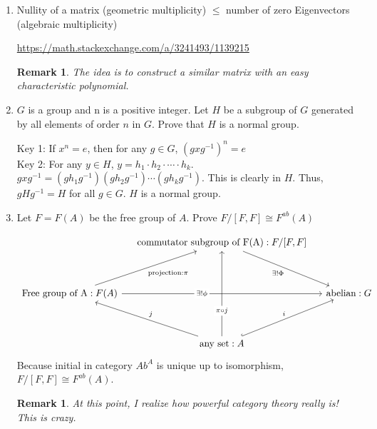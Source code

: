 \documentclass{article}
\newenvironment{solution}{
  \begin{tcolorbox}[mysolutionbox]
}{
  \end{tcolorbox}
}
\newtheorem{remark}[theorem]{Remark}
\begin{document}
\begin{enumerate}
    \item Nullity of a matrix (geometric multiplicity)  $\leq$ number of zero Eigenvectors (algebraic multiplicity)
    \begin{solution}
    \href{https://math.stackexchange.com/a/3241493/1139215}{https://math.stackexchange.com/a/3241493/1139215}
    \end{solution}
    \begin{remark}
        The idea is to construct a similar matrix with an easy characteristic  polynomial.
    \end{remark}
    \item $G$ is a group and n is a positive integer. Let $H$ be a subgroup of $G$ generated by all elements of order $n$ in $G$. Prove that $H$ is a normal group. 
    \begin{solution}
    Key 1: If $x^n=e$, then for any $g \in G$, $(gxg^{-1})^n=e$
    \\
    Key 2: For any $y \in H$, $y=h_1 \cdot h_2 \cdot \cdots \cdot h_k$. $gxg^{-1}=(gh_1g^{-1})(gh_2g^{-1}) \cdots (gh_kg^{-1})$. This is clearly in $H$. Thus, $gHg^{-1}=H$ for all $g \in G$. $H$ is a normal group. 
    \end{solution}
    \item Let $F=F(A)$ be the free group of $A$. Prove $F/[F,F]\cong F^{ab}(A)$
    \begin{solution}
        \[\begin{tikzcd}[column sep=tiny]
	&& {\text{commutator subgroup of F(A)}:F/[F,F]} \\
	\\
	{\text{Free group of A}: F(A)} &&&& \text{abelian}: G \\
	\\
	&& \text{any set}: A
	\arrow["{\exists! \Phi}"', from=1-3, to=3-5]
	\arrow["{\text{projection}:\pi}"', from=3-1, to=1-3]
	\arrow["{\exists !\phi}"{description, pos=0.4}, from=3-1, to=3-5]
	\arrow["{\pi \circ j}"{description, pos=0.3}, from=5-3, to=1-3]
	\arrow["j"', from=5-3, to=3-1]
	\arrow["i", hook, from=5-3, to=3-5]
\end{tikzcd}\]
    Because initial in category $Ab^{A}$ is unique up to isomorphism, $F/[F,F]\cong F^{ab}(A)$. 
    \end{solution}
    \begin{remark}
        At this point, I realize how powerful category theory really is! This is crazy. 
    \end{remark}
    \end{enumerate}
\end{document}
